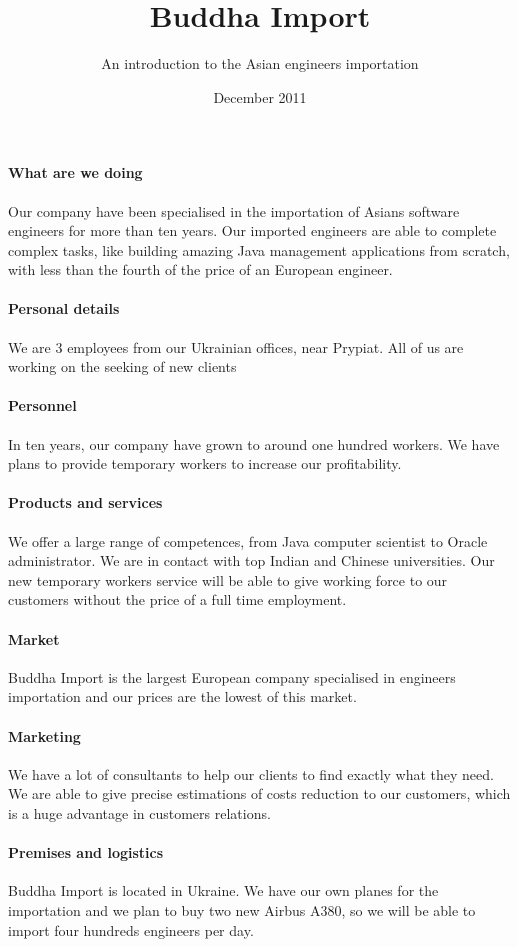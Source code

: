 \documentclass[a4paper,12pt]{article}
\title{Buddha Import}
\author{An introduction to the Asian engineers importation}
\date{December 2011}
\begin{document}
\maketitle 

\paragraph{What are we doing}
Our company have been specialised in the importation of Asians software
engineers for more than ten years. Our imported engineers are able to complete
complex tasks, like building amazing Java management applications from scratch,
with less than the fourth of the price of an European engineer.

\paragraph{Personal details}
We are 3 employees from our Ukrainian offices, near Prypiat. All of us are
working on the seeking of new clients 

\paragraph{Personnel}
In ten years, our company have grown to around one hundred workers. We have
plans to provide temporary workers to increase our profitability.

\paragraph{Products and services}
We offer a large range of competences, from Java computer scientist to Oracle
administrator. We are in contact with top Indian and Chinese universities. Our
new temporary workers service will be able to give working force to our
customers without the price of a full time employment. 

\paragraph{Market}
Buddha Import is the largest European company specialised in engineers
importation and our prices are the lowest of this market.

\paragraph{Marketing}
We have a lot of consultants to help our clients to find exactly what they
need. We are able to give precise estimations of costs reduction to our
customers, which is a huge advantage in customers relations.

\paragraph{Premises and logistics}
Buddha Import is located in Ukraine. We have our own planes for the importation
and we plan to buy two new Airbus A380, so we will be able to import four
hundreds engineers per day.
\end{document}
